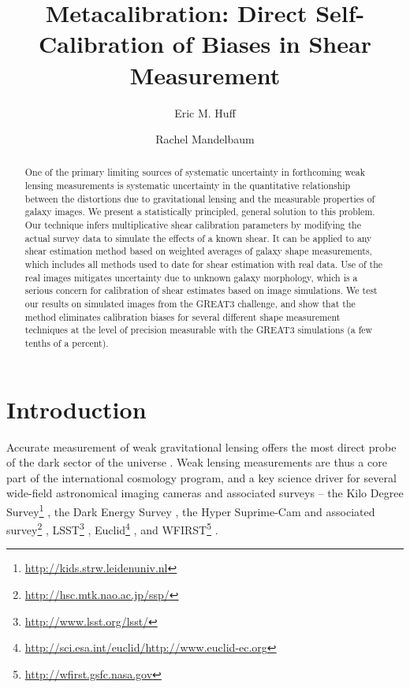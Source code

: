 \documentclass[iop]{emulateapj}
\begin{document}
\title{Metacalibration: Direct Self-Calibration of Biases in Shear Measurement}
\author{Eric M. Huff}
\author{Rachel Mandelbaum}



\begin{abstract}
  One of the primary limiting sources of systematic uncertainty in forthcoming weak lensing
  measurements is systematic uncertainty in the quantitative relationship between the distortions
  due to gravitational lensing and the measurable properties of galaxy images. We present a
  statistically principled, general solution to this problem. Our technique infers multiplicative
  shear calibration parameters by modifying the actual survey data to simulate the effects of a known
  shear. It can be applied to any shear estimation method based on weighted averages of galaxy shape
  measurements, which includes all methods used to date for shear estimation with real data.  Use of
  the real images mitigates uncertainty due to unknown galaxy morphology, which is a serious concern
  for calibration of shear estimates based on image simulations.  We test our results on simulated
  images from the GREAT3 challenge, and show that the method eliminates calibration biases for
  several different shape measurement techniques at the level of precision measurable with the
  GREAT3 simulations (a few tenths of a percent).
\end{abstract}

\section{Introduction}

Accurate measurement of weak gravitational lensing offers the most
direct probe of the dark sector of the universe
\citep[e.g.,][]{2001PhR...340..291B,2003ARA&A..41..645R,schneider06,2008ARNPS..58...99H,2010RPPh...73h6901M,2013PhR...530...87W}.
Weak lensing measurements are thus a core part of the international
cosmology program, and a key science driver for several wide-field
astronomical imaging cameras and associated surveys -- the Kilo Degree
Survey\footnote{\url{http://kids.strw.leidenuniv.nl}}
\citep{KiDS_main}, the Dark Energy Survey \citep{DES_main}, the
Hyper Suprime-Cam and associated survey\footnote{\url{http://hsc.mtk.nao.ac.jp/ssp/}}
\citep{HSC_main}, LSST\footnote{\url{http://www.lsst.org/lsst/}}
\citep{2009arXiv0912.0201L},
Euclid\footnote{\url{http://sci.esa.int/euclid/}\url{http://www.euclid-ec.org}}
\citep{2011arXiv1110.3193L}, and
WFIRST\footnote{\url{http://wfirst.gsfc.nasa.gov}}
\citep{2015arXiv150303757S}.
\end{document}
